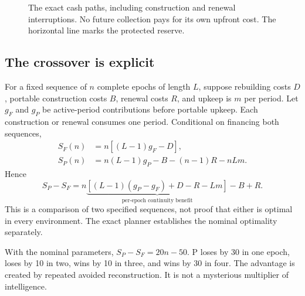 \begin{figure}[htbp]
\centering
{}
\caption{The exact cash paths, including construction and renewal interruptions. No future collection pays for its own upfront cost. The horizontal line marks the protected reserve.}
\end{figure}

\subsection{The crossover is explicit}
For a fixed sequence of $n$ complete epochs of length $L$, suppose rebuilding costs $D$, portable construction costs $B$, renewal costs $R$, and upkeep is $m$ per period. Let $g_F$ and $g_P$ be active-period contributions before portable upkeep. Each construction or renewal consumes one period. Conditional on financing both sequences,
\begin{align}
 S_F(n)&=n[(L-1)g_F-D],\\
 S_P(n)&=n(L-1)g_P-B-(n-1)R-nLm.
\end{align}
Hence
\begin{equation}
 S_P-S_F=n\underbrace{[(L-1)(g_P-g_F)+D-R-Lm]}_{\text{per-epoch continuity benefit}}-B+R.
 \label{eq:crossover}
\end{equation}
This is a comparison of two specified sequences, not proof that either is optimal in every environment. The exact planner establishes the nominal optimality separately.

With the nominal parameters, $S_P-S_F=20n-50$. P loses by 30 in one epoch, loses by 10 in two, wins by 10 in three, and wins by 30 in four. The advantage is created by repeated avoided reconstruction. It is not a mysterious multiplier of intelligence.


